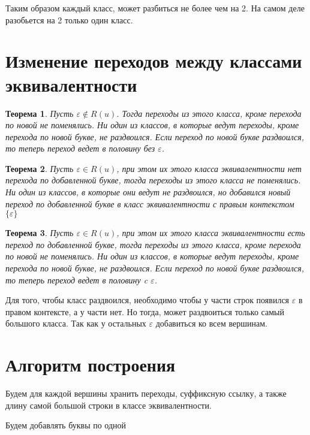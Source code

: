 \documentclass[12pt,a4paper]{article}
\theoremstyle{plain}
\newtheorem{thm}{Теорема}
\begin{document}
Таким образом каждый класс, может разбиться не более чем на 2.
На самом деле разобьется на 2 только один класс.

\section{Изменение переходов между классами эквивалентности}

\begin{thm}
Пусть $\varepsilon \notin R(u)$. Тогда переходы из этого класса, кроме перехода по новой не поменялись.
Ни один из классов, в которые ведут переходы, кроме перехода по новой букве, не раздвоился.
Если переход по новой букве раздвоился, то теперь переход ведет в половину без $\varepsilon$.
\end{thm}

\begin{thm}
Пусть $\varepsilon \in R(u)$, при этом их этого класса эквивалентности нет перехода по добавленной букве,
тогда переходы из этого класса не поменялись. Ни один из классов, в которые они ведут не раздвоился,
но добавился новый переход по добавленной букве в класс эквивалентности с правым контекстом $\{\varepsilon\}$
\end{thm}

\begin{thm}
Пусть $\varepsilon \in R(u)$, при этом их этого класса эквивалентности есть переход по добавленной букве,
тогда переходы из этого класса, кроме перехода по новой не поменялись. Ни один из классов, в которые ведут переходы,
кроме перехода по новой букве, не раздвоился. Если переход по новой букве раздвоился, то теперь переход ведет в половину c $\varepsilon$.
\end{thm}

Для того, чтобы класс раздвоился, необходимо чтобы у части строк появился $\varepsilon$ в правом контексте,
а у части нет. Но тогда, может раздвоиться только самый большого класса. Так как у остальных
$\varepsilon$ добавиться ко всем вершинам.

\section{Алгоритм построения}

Будем для каждой вершины хранить переходы,
суффиксную ссылку, а также длину самой большой строки в классе эквивалентности.

Будем добавлять буквы по одной
\end{document}
